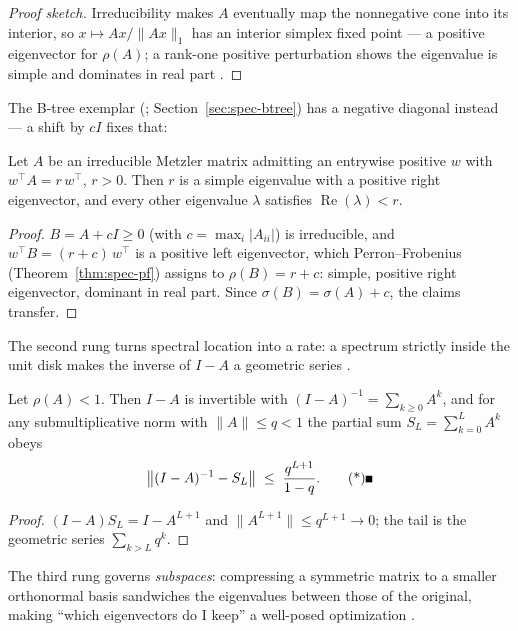 \begin{proof}[Proof sketch]
Irreducibility makes $A$ eventually map the nonnegative cone into its
interior, so $x \mapsto Ax/\|Ax\|_1$ has an interior simplex fixed point ---
a positive eigenvector for $\rho(A)$; a rank-one positive perturbation shows
the eigenvalue is simple and dominates in real part
\citep{spectral-matrix-bg1}.
\end{proof}

The B-tree exemplar (\citep{sigmod26-038}; Section~\ref{sec:spec-btree}) has
a negative diagonal instead --- a shift by $cI$ fixes that:

\begin{corollary}\label{cor:spec-metzler}
Let $A$ be an irreducible Metzler matrix admitting an entrywise positive $w$
with $w^{\top}\!A = r\,w^{\top}$, $r > 0$. Then $r$ is a simple eigenvalue
with a positive right eigenvector, and every other eigenvalue $\lambda$
satisfies $\operatorname{Re}(\lambda) < r$. \eop
\end{corollary}

\begin{proof}
$B = A + cI \ge 0$ (with $c = \max_i |A_{ii}|$) is irreducible, and
$w^{\top}\!B = (r+c)\,w^{\top}$ is a positive left eigenvector, which
Perron--Frobenius (Theorem~\ref{thm:spec-pf}) assigns to $\rho(B) = r+c$:
simple, positive right eigenvector, dominant in real part. Since
$\sigma(B) = \sigma(A) + c$, the claims transfer.
\end{proof}

The second rung turns spectral location into a rate: a spectrum strictly
inside the unit disk makes the inverse of $I - A$ a geometric series
\citep{spectral-matrix-bg1}.

\begin{theorem}\label{thm:spec-neumann}
Let $\rho(A) < 1$. Then $I - A$ is invertible with $(I-A)^{-1} = \sum_{k \ge 0}
A^k$, and for any submultiplicative norm with $\|A\| \le q < 1$ the partial
sum $S_L = \sum_{k=0}^{L} A^k$ obeys
\[
\bigl\|(I-A)^{-1} - S_L\bigr\| \;\le\; \frac{q^{L+1}}{1-q}. \eopm
\]
\end{theorem}

\begin{proof}
$(I-A)S_L = I - A^{L+1}$ and $\|A^{L+1}\| \le q^{L+1} \to 0$; the tail is the
geometric series $\sum_{k > L} q^k$.
\end{proof}

The third rung governs \emph{subspaces}: compressing a symmetric matrix to a
smaller orthonormal basis sandwiches the eigenvalues between those of the
original, making ``which eigenvectors do I keep'' a well-posed optimization
\citep{spectral-matrix-bg1,spectral-matrix-bg2}.


